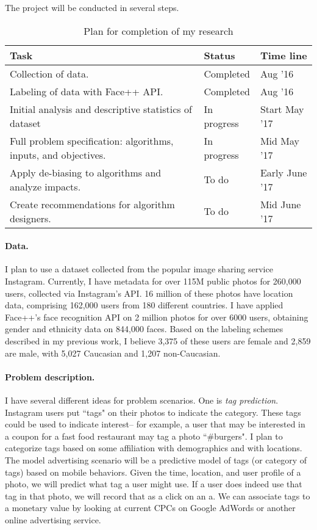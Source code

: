 The project will be conducted in several steps.

\begin{table}[h]
\begin{small}
\begin{center}
\begin{tabular}{lll}
Task & Status & Time line \\
\hline
Collection of data. & Completed & Aug '16 \\
Labeling of data with Face++ API. & Completed & Aug '16 \\
Initial analysis and descriptive statistics of dataset & In progress & Start May '17 \\
Full problem specification: algorithms, inputs, and objectives. & In progress & Mid May '17\\
Apply de-biasing to algorithms and analyze impacts. & To do & Early June '17\\
Create recommendations for algorithm designers. & To do & Mid June '17\\
\end{tabular}
\end{center}
\end{small}
\caption{Plan for completion of my research}
\label{tab:plan}
\end{table}


\paragraph{Data.}
I plan to use a dataset collected from the popular image sharing service Instagram.
Currently, I have metadata for over 115M public photos for 260,000 users, collected via Instagram's API.
16 million of these photos have location data, comprising 162,000 users from 180 different countries.
I have applied Face++'s face recognition API on 2 million photos for over 6000 users, obtaining  gender and ethnicity data on 844,000 faces.
Based on the labeling schemes described in my previous work, I believe 3,375 of these users are female and 2,859 are male, with 5,027 Caucasian and 1,207 non-Caucasian.

\paragraph{Problem description.}
I have several different ideas for problem scenarios.
One is \emph{tag prediction}.
Instagram users put ``tags" on their photos to indicate the category.
These tags could be used to indicate interest-- for example, a user that may be interested in a coupon for a fast food restaurant may tag a photo ``\#burgers".
I plan to categorize tags based on some affiliation with demographics and with locations.
The model advertising scenario will be a predictive model of tags (or category of tags) based on mobile behaviors.
Given the time, location, and user profile of a photo, we will predict what tag a user might use.
If a user does indeed use that tag in that photo, we will record that as a click on an a.
We can associate tags to a monetary value by looking at current CPCs on Google AdWords or another online advertising service.

